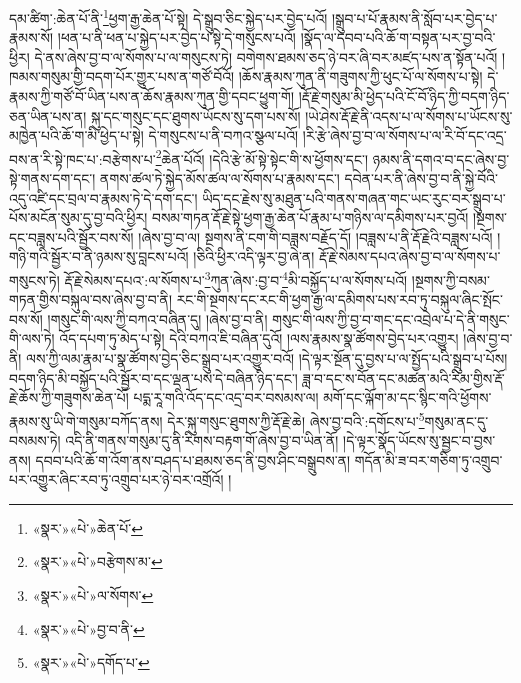 དམ་ཚིག་:ཆེན་པོ་ནི་\footnote{«སྣར་»«པེ་»ཆེན་པོ་}ཕྱག་རྒྱ་ཆེན་པོ་སྟེ། དེ་སྒྲུབ་ཅིང་སྐྱེད་པར་བྱེད་པའོ། །སྒྲུབ་པ་པོ་རྣམས་ནི་སློབ་པར་བྱེད་པ་རྣམས་སོ། །ཕན་པ་ནི་ཕན་པ་སྐྱེད་པར་བྱེད་པ་སྟེ་དེ་གསུངས་པའོ། །སྣོད་ལ་དབབ་པའི་ཆོ་ག་བསྟན་པར་བྱ་བའི་ཕྱིར། དེ་ནས་ཞེས་བྱ་བ་ལ་སོགས་པ་ལ་གསུངས་ཏེ། བགེགས་ཐམས་ཅད་ཉེ་བར་ཞི་བར་མཛད་པས་ན་སྟོན་པའོ། །ཁམས་གསུམ་གྱི་བདག་པོར་གྱུར་པས་ན་གཙོ་བོའོ། །ཆོས་རྣམས་ཀུན་ནི་གཟུགས་ཀྱི་ཕུང་པོ་ལ་སོགས་པ་སྟེ། དེ་རྣམས་ཀྱི་གཙོ་བོ་ཡིན་པས་ན་ཆོས་རྣམས་ཀུན་གྱི་དབང་ཕྱུག་གོ། །རྡོ་རྗེ་གསུམ་མི་ཕྱེད་པའི་ངོ་བོ་ཉིད་ཀྱི་བདག་ཉིད་ཅན་ཡིན་པས་ན། སྐུ་དང་གསུང་དང་ཐུགས་ཡོངས་སུ་དག་པས་སོ། །ཡེ་ཤེས་རྡོ་རྗེ་ནི་འདས་པ་ལ་སོགས་པ་ཡོངས་སུ་མཁྱེན་པའི་ཆོ་ག་མི་ཕྱེད་པ་སྟེ། དེ་གསུངས་པ་ནི་བཀའ་སྩལ་པའོ། །རི་རྩེ་ཞེས་བྱ་བ་ལ་སོགས་པ་ལ་རི་བོ་དང་འདྲ་བས་ན་རི་སྟེ་ཁང་པ་:བརྩེགས་པ་\footnote{«སྣར་»«པེ་»བརྩེགས་མ་}ཆེན་པོའོ། །དེའི་རྩེ་མོ་སྟེ་སྟེང་གི་ས་ཕྱོགས་དང་། ཉམས་ནི་དགའ་བ་དང་ཞེས་བྱ་སྟེ་གནས་དག་དང་། ནགས་ཚལ་ཏེ་སྐྱེད་མོས་ཚལ་ལ་སོགས་པ་རྣམས་དང་། དབེན་པར་ནི་ཞེས་བྱ་བ་ནི་སྐྱེ་བོའི་འདུ་འཛི་དང་བྲལ་བ་རྣམས་ཏེ་དེ་དག་དང་། ཡིད་དང་རྗེས་སུ་མཐུན་པའི་གནས་གཞན་གང་ཡང་རུང་བར་སྒྲུབ་པ་པོས་མངོན་སུམ་དུ་བྱ་བའི་ཕྱིར། བསམ་གཏན་རྡོ་རྗེ་སྟེ་ཕྱག་རྒྱ་ཆེན་པོ་རྣམ་པ་གཉིས་ལ་དམིགས་པར་བྱའོ། །སྔགས་དང་བཟླས་པའི་སྦྱོར་བས་སོ། །ཞེས་བྱ་བ་ལ། སྔགས་ནི་ངག་གི་བཟླས་བརྗོད་དོ། །བཟླས་པ་ནི་རྡོ་རྗེའི་བཟླས་པའོ། །གཉི་གའི་སྦྱོར་བ་ནི་ཉམས་སུ་བླངས་པའོ། །ཅིའི་ཕྱིར་འདི་ལྟར་བྱ་ཞེ་ན། རྡོ་རྗེ་སེམས་དཔའ་ཞེས་བྱ་བ་ལ་སོགས་པ་གསུངས་ཏེ། རྡོ་རྗེ་སེམས་དཔའ་:ལ་སོགས་པ་\footnote{«སྣར་»«པེ་»ལ་སོགས་}ཀུན་ཞེས་:བྱ་བ་\footnote{«སྣར་»«པེ་»བྱ་བ་ནི་}མི་བསྐྱོད་པ་ལ་སོགས་པའོ། །སྔགས་ཀྱི་བསམ་གཏན་གྱིས་བསྐུལ་བས་ཞེས་བྱ་བ་ནི། རང་གི་སྔགས་དང་རང་གི་ཕྱག་རྒྱ་ལ་དམིགས་པས་རབ་ཏུ་བསྐུལ་ཞིང་སྤོང་བས་སོ། །གསུང་གི་ལས་ཀྱི་བཀའ་བཞིན་དུ། །ཞེས་བྱ་བ་ནི། གསུང་གི་ལས་ཀྱི་བྱ་བ་གང་དང་འབྲེལ་པ་དེ་ནི་གསུང་གི་ལས་ཏེ། འོད་དཔག་ཏུ་མེད་པ་སྟེ། དེའི་བཀའ་ཇི་བཞིན་དུའོ། །ལས་རྣམས་སྣ་ཚོགས་བྱེད་པར་འགྱུར། །ཞེས་བྱ་བ་ནི། ལས་ཀྱི་ལམ་རྣམ་པ་སྣ་ཚོགས་བྱེད་ཅིང་སྒྲུབ་པར་འགྱུར་བའོ། །དེ་ལྟར་སྔོན་དུ་བྱས་པ་ལ་སྤྱོད་པའི་སྒྲུབ་པ་པོས། བདག་ཉིད་མི་བསྐྱོད་པའི་སྦྱོར་བ་དང་ལྡན་པས་དེ་བཞིན་ཉིད་དང་། ཟླ་བ་དང་ས་བོན་དང་མཚན་མའི་རིམ་གྱིས་རྡོ་རྗེ་ཆོས་ཀྱི་གཟུགས་ཆེན་པོ། པདྨ་རཱ་གའི་འོད་དང་འདྲ་བར་བསམས་ལ། མགོ་དང་ལྐོག་མ་དང་སྙིང་གའི་ཕྱོགས་རྣམས་སུ་ཡི་གེ་གསུམ་བཀོད་ནས། དེར་སྐུ་གསུང་ཐུགས་ཀྱི་རྡོ་རྗེ་ཆེ། ཞེས་བྱ་བའི་:དགོངས་པ་\footnote{«སྣར་»«པེ་»དགོད་པ་}གསུམ་ནང་དུ་བསམས་ཏེ། འདི་ནི་གནས་གསུམ་དུ་ནི་རིགས་བརྟག་གོ་ཞེས་བྱ་བ་ཡིན་ནོ། །དེ་ལྟར་སྣོད་ཡོངས་སུ་སྦྱང་བ་བྱས་ནས། དབབ་པའི་ཆོ་ག་འོག་ནས་བཤད་པ་ཐམས་ཅད་ནི་བྱས་ཤིང་བསྒྲུབས་ན། གདོན་མི་ཟ་བར་གཅིག་ཏུ་འགྲུབ་པར་འགྱུར་ཞིང་རབ་ཏུ་འགྲུབ་པར་ཉེ་བར་འགྲོའོ། །
